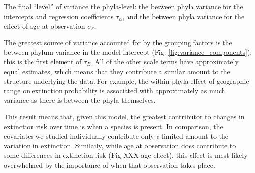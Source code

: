 \documentclass[12pt,letterpaper]{article}
\begin{document}
The final ``level'' of variance the phyla-level: the between phyla variance for the intercepts and regression coefficients \(\tau_{\alpha}\), and the between phyla variance for the effect of age at observation \(\sigma_{\delta}\). 

The greatest source of variance accounted for by the grouping factors is the between phylum variance in the model intercept (Fig. \ref{fig:variance_components}); this is the first element of \(\tau_{B}\). All of the other scale terms have approximately equal estimates, which means that they contribute a similar amount to the structure underlying the data. For example, the within-phyla effect of geographic range on extinction probability is associated with approximately as much variance as there is between the phyla themselves.

This result means that, given this model, the greatest contributor to changes in extinction risk over time is when a species is present. In comparison, the covariates we studied individually contribute only a limited amount to the variation in extinction. Similarly, while age at observation does contribute to some differences in extinction risk (Fig XXX age effect), this effect is most likely overwhelmed by the importance of when that observation takes place.
\end{document}
